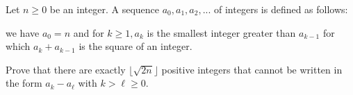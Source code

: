 Let $n \ge  0$ be an integer. A sequence $a_0,a_1,a_2,...$ of integers is defined as follows:

we have $a_0 = n$ and for $k \ge 1, a_k$ is the smallest integer greater than $a_{k-1}$ for which $a_k +a_{k-1}$ is the square of an integer.

Prove that there are exactly $\lfloor \sqrt{2n}\rfloor$  positive integers that cannot be written in the form $a_k - a_{\ell}$ with $k > \ell\ge  0$.